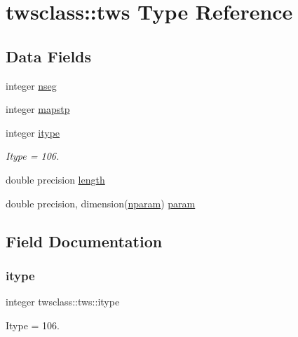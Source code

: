 \hypertarget{structtwsclass_1_1tws}{}\section{twsclass\+::tws Type Reference}
\label{structtwsclass_1_1tws}
\subsection*{Data Fields}
\begin{DoxyCompactItemize}
\item 
integer \mbox{\hyperlink{structtwsclass_1_1tws_a9977eae9217b979dc25554e7f3453339}{nseg}}
\item 
integer \mbox{\hyperlink{structtwsclass_1_1tws_a023933666722b8509103d43f82f3c251}{mapstp}}
\item 
integer \mbox{\hyperlink{structtwsclass_1_1tws_a2dcf113402de09fb0cbb7a7779dd11f2}{itype}}
\begin{DoxyCompactList}\small\item\em Itype = 106. \end{DoxyCompactList}\item 
double precision \mbox{\hyperlink{structtwsclass_1_1tws_a21f6cc9104c13b52b03da5b9e283f07b}{length}}
\item 
double precision, dimension(\mbox{\hyperlink{namespacetwsclass_ae92106a92b2952cbb34ae48df4c6b375}{nparam}}) \mbox{\hyperlink{structtwsclass_1_1tws_ada2bbea749395b11dbf0f9d8b27b5fcf}{param}}
\end{DoxyCompactItemize}


\subsection{Field Documentation}
\mbox{\label{structtwsclass_1_1tws_a2dcf113402de09fb0cbb7a7779dd11f2}} 
\subsubsection{\texorpdfstring{itype}{itype}}
{\footnotesize\ttfamily integer twsclass\+::tws\+::itype}



Itype = 106. 

\mbox{\label{structtwsclass_1_1tws_a21f6cc9104c13b52b03da5b9e283f07b}} 

